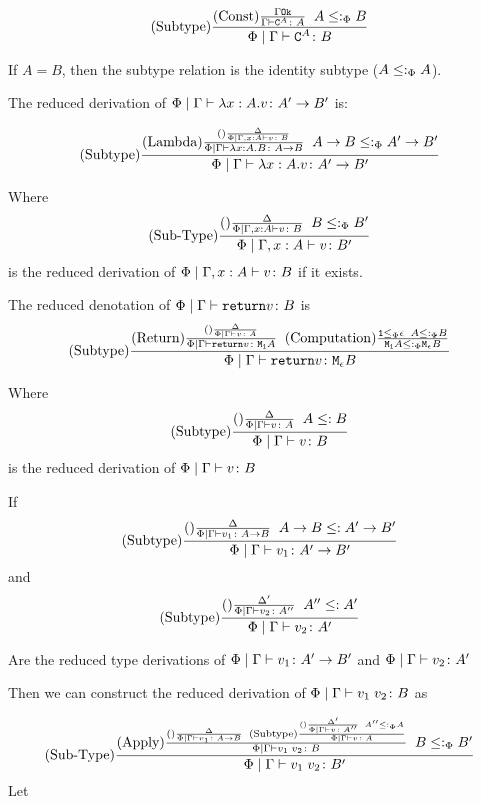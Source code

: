 \documentclass{report}
\begin{document}
    $$
        (\text{Subtype}) \frac{(\text{Const}) \frac{\Gamma \texttt{Ok}}{\Gamma \vdash \texttt{C}^{A} \colon A}\;\; A \leq:_\Phi B}{\Phi\mid\Gamma \vdash \texttt{C}^{A} \colon B}
    $$

    If $A = B$, then the subtype relation is the identity subtype ($A \leq:_\Phi A$).

    The reduced derivation of $\Phi\mid\Gamma \vdash \lambda x : A. v \colon A'\rightarrow B'$ is:


    $$
    (\text{Subtype}) \frac{(\text{Lambda}) \frac{(\text{}) \frac{\Delta}{\Phi\mid\Gamma, x: A \vdash v \colon B}}{
        \Phi\mid\Gamma \vdash \lambda x : A. B \colon A\rightarrow B}
        \;\;
        A\rightarrow B \leq:_\Phi A'\rightarrow B'
    }{
       \Phi\mid\Gamma \vdash \lambda x : A. v \colon A'\rightarrow B' 
    }
    $$

    Where 
    \begin{equation}
        (\text{Sub-Type}) \frac{(\text{}) \frac{\Delta}{\Phi\mid\Gamma, x: A \vdash v \colon B}\;\; B\leq:_\Phi B'}{\Phi\mid\Gamma, x: A \vdash v \colon B'}
    \end{equation}
    is the reduced derivation of $\Phi\mid\Gamma, x: A \vdash v \colon B$ if it exists.

    The reduced denotation of $\Phi\mid\Gamma \vdash \texttt{return} v \colon B$ is 
    $$
        (\text{Subtype}) \frac{
            (\text{Return}) \frac{(\text{}) \frac{\Delta}{\Phi\mid\Gamma \vdash v \colon A}}{\Phi\mid\Gamma \vdash \texttt{return} v \colon \texttt{M}_{\texttt{1}}{A}}
            \;\;
            (\text{Computation}) \frac{ \texttt{1}\leq_{\Phi} \epsilon\;\; A \leq:_\Phi B }{\texttt{M}_{\texttt{1}}{ A }\leq:_\Phi\texttt{M}_{\epsilon}{B}}
        }{\Phi\mid\Gamma \vdash \texttt{return} v \colon \texttt{M}_{\epsilon}{B}}
    $$

    Where $$(\text{Subtype}) \frac{(\text{}) \frac{\Delta}{\Phi \mid \Gamma \vdash v \colon A}\;\; A \leq: B}{\Phi \mid \Gamma \vdash v \colon B}$$ is the reduced derivation of $\Phi\mid\Gamma \vdash v \colon B$
    
    If 
    $$
        (\text{Subtype}) \frac{(\text{}) \frac{\Delta}{\Phi \mid \Gamma \vdash v_1 \colon A\rightarrow B}\;\; A\rightarrow B \leq: A'\rightarrow B'}{\Phi \mid \Gamma \vdash v_1 \colon A'\rightarrow B'}
    $$ and $$
        (\text{Subtype}) \frac{(\text{}) \frac{\Delta'}{\Phi\mid \Gamma \vdash v_2 \colon A''}\;\; A'' \leq: A'}{\Phi\mid \Gamma \vdash v_2 \colon A'}
    $$

    Are the reduced type derivations of $\Phi\mid\Gamma \vdash v_1 \colon A'\rightarrow B'$ and $\Phi\mid\Gamma \vdash v_2 \colon A'$



    Then we can construct the reduced derivation of $\Phi\mid\Gamma \vdash v_1\; v_2 \colon B$ as

    $$
        (\text{Sub-Type}) \frac{
            (\text{Apply}) \frac{
                (\text{}) \frac{\Delta}{
                    \Phi\mid\Gamma \vdash v_1 \colon A\rightarrow B
                }
                \;\;
                (\text{Subtype}) \frac{
                    (\text{}) \frac{\Delta'}{
                        \Phi\mid\Gamma \vdash v \colon A''
                    } \;\; A'' \leq:_\Phi A
                }{\Phi\mid\Gamma \vdash v \colon A}
            }{
                \Phi\mid\Gamma \vdash v_1\; v_2 \colon B
            }
            \;\;
            B \leq:_\Phi B'
        }{
            \Phi\mid\Gamma \vdash v_1\; v_2 \colon B'
        }
    $$
    Let
\end{document}
